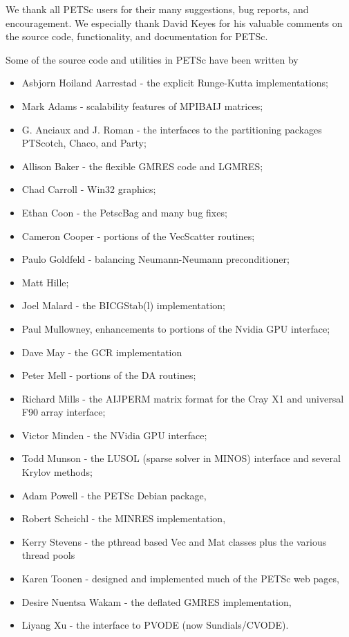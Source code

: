 %
%

\medskip \medskip \noindent
We thank all PETSc users for their many suggestions, bug reports, and
encouragement.  We especially thank David Keyes
for his valuable comments on the source code,
functionality, and documentation for PETSc.


\vspace{.3in}
\noindent
Some of the source code and utilities in PETSc
have been written by 
\begin{itemize}
  \item Asbjorn Hoiland Aarrestad - the explicit Runge-Kutta implementations;
  \item Mark Adams - scalability features of MPIBAIJ matrices;
  \item G. Anciaux and J. Roman - the interfaces to the partitioning packages PTScotch, Chaco, and Party;
  \item Allison Baker - the flexible GMRES code and LGMRES;
  \item Chad Carroll - Win32 graphics;
  \item Ethan Coon - the PetscBag and many bug fixes;
  \item Cameron Cooper - portions of the VecScatter routines;
  \item Paulo Goldfeld - balancing Neumann-Neumann preconditioner;
  \item Matt Hille;
  \item Joel Malard - the BICGStab(l) implementation;
  \item Paul Mullowney, enhancements to portions of the Nvidia GPU interface;
  \item Dave May - the GCR implementation
  \item Peter Mell - portions of the DA routines;
  \item Richard Mills - the AIJPERM matrix format for the Cray X1 and universal F90 array interface;
  \item Victor Minden - the NVidia GPU interface;
  \item Todd Munson - the LUSOL (sparse solver in MINOS) interface and several Krylov methods;
  \item Adam Powell - the PETSc Debian package, 
  \item Robert Scheichl - the MINRES implementation,
  \item Kerry Stevens - the pthread based Vec and Mat classes plus the various thread pools
  \item Karen Toonen - designed and implemented much of the PETSc web pages,
  \item Desire Nuentsa Wakam - the deflated GMRES implementation,
  \item Liyang Xu - the interface to PVODE (now Sundials/CVODE).
\end{itemize}

